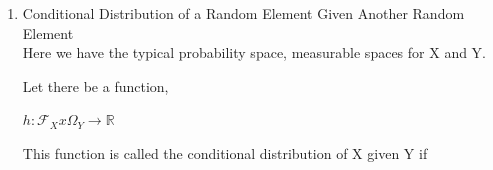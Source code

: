 \documentclass[11pt,fleqn]{book} %
\begin{document}
\begin{enumerate}
\begin{theorem}[34.4 in Billingsly]
		This is called the Law of Iterative Conditional Expectation. 
	\end{theorem}

	\begin{theorem}[34.3 in Billingsly]
		
		If $X$ measurable $\mathcal{G}$, $Y \textcircled{m} \mathcal{F}$, then

				$$E(X Y||\mathcal{G}) = XE(Y ||\mathcal{G}) a.s. P $$
	\end{theorem}

	Other Properties

		\begin{enumerate}
			\item X, Y are random elements such that XY integrable P.
			\item If $\mathcal{G} \subseteq \mathcal{F}$ is the sub $\sigma$-field, then

					$$E(X E(Y||\mathcal{G})) = E(E(X ||\mathcal{G})Y) = E(E(X ||\mathcal{G}) E(Y ||\mathcal{G})) $$ 

			Conditional expectation is a self-adjoint operation. 

			\begin{proof}

			"Wire Theorem"\\

				$$\begin{aligned}
								E(X E(Y ||\mathcal{G}))	& = E( E(X E(Y ||\mathcal{G}) ||\mathcal{G}))\\
									&= E( E(Y ||\mathcal{G})E(X ||\mathcal{G}))	\\
									&= E( E(E(X ||\mathcal{G}) Y ||\mathcal{G})) \\
									&= 	E(E(X ||\mathcal{G}) Y)	
								\end{aligned}$$
			\end{proof}
		\end{enumerate}

	\item Conditional Distribution of a Random Element Given Another Random Element\\

		Here we have the typical probability space, measurable spaces for X and Y. 

		Let there be a function, 

			$h: \mathcal{F}_X x \Omega_Y \rightarrow \mathbb{R}$

		This function is called the conditional distribution of X given Y if 


\end{enumerate}
\end{document}
